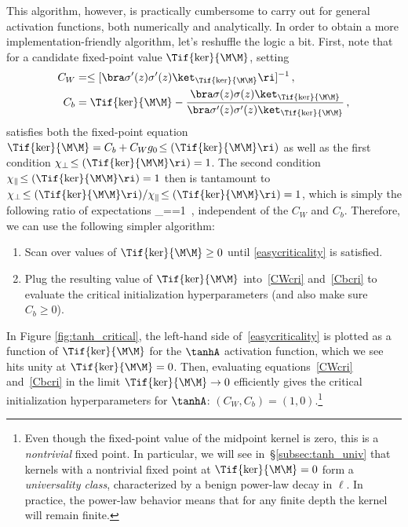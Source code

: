 This algorithm, however, is practically cumbersome to carry out for general activation functions, both numerically and analytically. In order to obtain a more implementation-friendly algorithm, let's reshuffle the logic a bit.
First, note that for a candidate fixed-point value $\Tif{\ker}{\M\M}$, setting
\begin{align}
\label{CWcri}
C_W&=\le[ \bra\sigma'(z)\sigma'(z) \ket_{\Tif{\ker}{\M\M}}\ri]^{-1} \, ,\\ %
\label{Cbcri}
C_b&=\Tif{\ker}{\M\M}-\frac{\bra\sigma(z)\sigma(z) \ket_{\Tif{\ker}{\M\M}}}{\bra\sigma'(z)\sigma'(z) \ket_{\Tif{\ker}{\M\M}}} \, ,
\end{align}
satisfies both the fixed-point equation $\Tif{\ker}{\M\M}=C_b+C_W g_0\!\le(\Tif{\ker}{\M\M}\ri)$ as well as the first  condition $\chi_{\perp}\!\le(\Tif{\ker}{\M\M}\ri)=1$.
The second  condition $\chi_{\parallel}\!\le(\Tif{\ker}{\M\M}\ri)=1$ then is tantamount to $\chi_{\perp}\!\le(\Tif{\ker}{\M\M}\ri)/\chi_{\parallel}\!\le(\Tif{\ker}{\M\M}\ri)=1$, which is simply the following ratio of expectations
\be\label{easycriticality}
\Bigg\vert_{\ker=\Tif{\ker}{\M\M}}=1\, ,
\ee
independent of the  $C_W$ and $C_b$.
Therefore, we can use the following simpler algorithm:
\begin{enumerate}
\item Scan over values of $\Tif{\ker}{\M\M}\geq 0$ until \eqref{easycriticality} is satisfied.
\item Plug the resulting value of $\Tif{\ker}{\M\M}$ into~\eqref{CWcri} and~\eqref{Cbcri} to evaluate the critical initialization hyperparameters (and also make sure $C_b\geq0$).
\end{enumerate}
In Figure \ref{fig:tanh_critical}, the left-hand side of~\eqref{easycriticality} is plotted as a function of $\Tif{\ker}{\M\M}$ for the $\tanhA$ activation function, which we see hits unity at $\Tif{\ker}{\M\M}=0$.  Then, evaluating equations~\eqref{CWcri} and~\eqref{Cbcri} in the limit $\Tif{\ker}{\M\M}\rightarrow0$ efficiently gives the critical initialization hyperparameters for $\tanhA$: $(C_W,C_b)=(1,0)$.\footnote{
Even though the fixed-point value of the midpoint kernel is zero, this is a \emph{nontrivial} fixed point. In particular, we will see in~\S\ref{subsec:tanh_univ} that kernels with a nontrivial fixed point at $\Tif{\ker}{\M\M}=0$ form a \emph{universality class}, characterized by a benign power-law decay in $\ell$. In practice, the power-law behavior means that for any finite depth the kernel will remain finite.}


